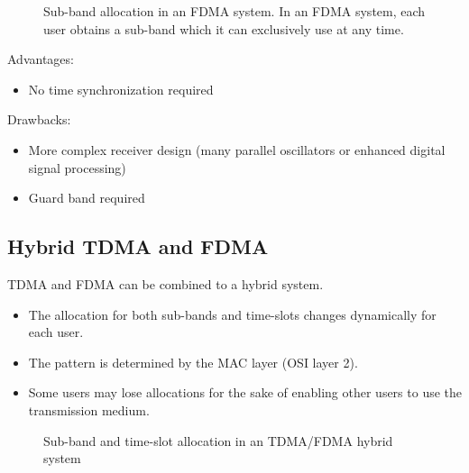 \begin{refsection}
\begin{figure}[H]
	\caption[Sub-band allocation in an \acs{FDMA} system]{Sub-band allocation in an \acs{FDMA} system. In an \acs{FDMA} system, each user obtains a sub-band which it can exclusively use at any time.}
\end{figure}

Advantages:
\begin{itemize}
	\item No time synchronization required
\end{itemize}

Drawbacks:
\begin{itemize}
	\item More complex receiver design (many parallel oscillators or enhanced digital signal processing)
	\item Guard band required
\end{itemize}

\subsection{Hybrid TDMA and FDMA}

\ac{TDMA} and \ac{FDMA} can be combined to a hybrid system.
\begin{itemize}
	\item The allocation for both sub-bands and time-slots changes dynamically for each user.
	\item The pattern is determined by the \ac{MAC} layer (\acs{OSI} layer 2).
	\item Some users may lose allocations for the sake of enabling other users to use the transmission medium.
\end{itemize}

\begin{figure}[H]
	\centering
	\caption{Sub-band and time-slot allocation in an \acs{TDMA}/\acs{FDMA} hybrid system}
\end{figure}


\end{refsection}
